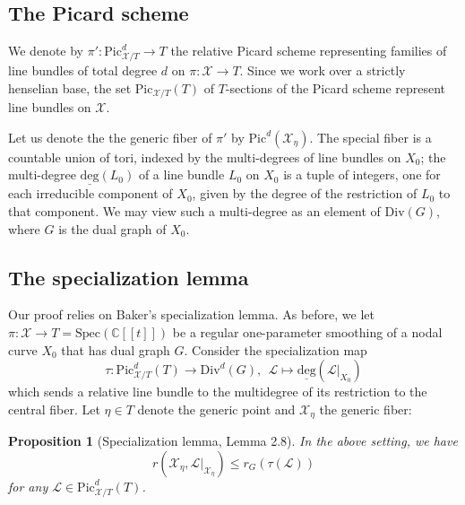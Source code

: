 \documentclass[11pt]{amsart}
\newtheorem{proposition}{Proposition}
\newcommand{\cX}{\mathcal X}
\begin{document}
\subsection{The Picard scheme} We denote by $\pi'\colon \mathrm{Pic}^d_{\mathcal{X}/T}\to T$ the relative Picard scheme representing families of line bundles of total degree $d$ on $\pi\colon\mathcal{X}\to T$. Since we work over a strictly henselian base, the set $\mathrm{Pic}_{\cX/T}(T)$ of $T$-sections of the Picard scheme represent line bundles on $\mathcal{X}$. 

Let us denote the the generic fiber of $\pi'$ by $\mathrm{Pic}^d(\mathcal{X}_\eta)$. The special fiber is a countable union of tori, indexed by the multi-degrees of line bundles on $X_0$; the multi-degree $\underline{\mathrm{deg}}(L_0)$ of a line bundle $L_0$ on $X_0$ is a tuple of integers, one for each irreducible component of $X_0$, given by the degree of the restriction of $L_0$ to that component. We may view such a multi-degree as an element of $\mathrm{Div}(G)$, where $G$ is the dual graph of $X_0$.



\subsection{The specialization lemma} Our proof relies on 
Baker's specialization lemma. As before, we let $\pi\colon\mathcal{X}\to T=\mathrm{Spec}(\mathbb{C}[[t]])$ be a regular one-parameter smoothing of a nodal curve $X_0$ that has dual graph $G$. Consider the specialization map $$\tau\colon\mathrm{Pic}_{\mathcal{X}/T}^d(T)\to\mathrm{Div}^d(G),\ \ \mathcal L\mapsto\underline{\mathrm{deg}}(\mathcal L|_{X_0})$$ which sends a relative line bundle to the multidegree of its restriction to the central fiber. Let $\eta\in T$ denote the generic point and $\mathcal{X}_\eta$ the generic fiber:

\begin{proposition}[Specialization lemma, \cite{MR2448666} Lemma 2.8]\label{mixed}
   In the above setting, we have $$r(\cX_\eta,\mathcal L|_{\mathcal{X}_\eta})\leq r_G(\tau(\mathcal L))$$
   for any $\mathcal L \in \mathrm{Pic}_{\mathcal{X}/T}^d(T)$.
\end{proposition}
\end{document}

